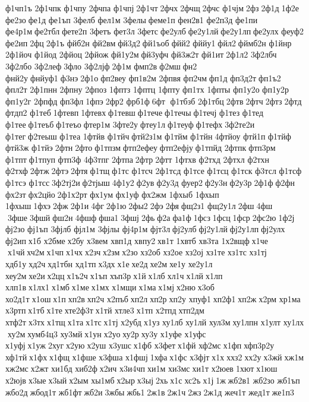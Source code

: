 ф1чп1ъ 
2ф1чпк 	ф1чпу 	2фчпа 	ф1чпј 2ф1чт 2фчх 2фчщ 2фчс 	ф1чјм 2фз 2ф1д 1ф2е 	фе2зо фе1д 	фе1ъп 	3фелб 	фел1м 	3фелы феме1п 
фен2в1 
фе2п3д 	фе1пи 
фе4р1м фе2тбл фете2п 	3фетъ 	фет3л 	3фетс фе2улб фе2у1лй фе2у1лп фе2улх 	феуф2 	фе2ип 2фц 2ф1ъ 	фйб2н 	фй2вм фй3д2 фй1ъоб фйй2 	фййу1 фйл2 фймб2н 	ф1йнр 
2ф1йоч 	ф1йод 	2фйоц 	2фйож 
фй1у2м фй3уфч 
фй3ж2т 	фй1ит 2ф1л2 
3ф2лбч 
3ф2лбо 
3ф2леф 3фло 
3ф2лјф 2ф1м 	фмп2в ф2мш фн2 	фнй2у фнйуф1 ф3нэ 2ф1о фп2веу 
фп1в2м 	2фпвя 	фп2чм фп1д 
фп3д2т фп1ъ2 	фпл2т 
2ф1пнн 	2фпну 	2фпоз 	1фптз 	1фптц 	1фпту 	фп1тх 	1фпты 
фп1у2о 
фп1у2р 
фп1у2г 	2фпфд 	фп3фл 1фпэ 2фр2 	фрб1ф 6фт  ф1тбзб 
2ф1тбц 2фтв 2фтч 2фтз 2фтд 	фтдп2 	ф1теб 1фтевп 1фтевх ф1тевш ф1тече ф1течы ф1течј 	ф1тез 	ф1тед 	ф1тее ф1теъб ф1теъо фтер1м 
3фте2у фтеу1л ф1теуф ф1тефх 3ф2те2и 	ф1тег ф2теыш 	ф1теа 	1фтйв 	ф1тйч фтй2з1м 	ф1тйм 	ф1тйн 4фтйоу 	фтй1п 	ф1тйф 	фтй3ж 	ф1тйэ 2фтн 2фто ф1тпзм фтп2ефеу фтп2ефју ф1тпйд 	2фтпк фтп3рм 	ф1тпт ф1тпуп 	фтп3ф 
4ф3тпг 	2фтпа 2фтр 2фтт 	1фтхв 	ф2тхд 	2фтхл 	ф2тхн 	ф2тхф 2фтж 2фтэ 2фтя ф1тщ ф1тс  	ф1тсч 
2ф1тсд 	ф1тсе 	ф1тсц 	ф1тск 	ф3тсл 	ф1тсф 	ф1тсэ 	ф1тсс 3ф2тј2и ф2тјыш 4ф1у2 ф2ув ф2у3д 	фуер2 ф2у3н ф2у3р 2ф1ф ф2фн 	фх2зт фх2цйо 2ф1х2рт 	фх1ум 	фх1уф 	фх2жм 	1фхыб 	1фхып 	1фхыш 1фхэ 2фж 2ф1и 4фг 2ф1ю 2фы2 2фэ 2фя фщ2з1 
фщ2у1л 2фш 4фш  3фше 3фшй фш2н 4фшф фша1 3фшј 2фь ф2а фа1ф 1фсз 1фсц 1фср 2фс2ю 1ф2ј 	фј2зо 	фј1ъп 	3фјлб 	фјл1м 	3фјлы 
фј4р1м 	фјт3л фј2улб фј2у1лй фј2у1лп фј2улх 	фј2ип х1б 	х2бме х2бу 	х3вем 	хвп1д 	хвпу2 хв1т 	1хвтб 	хв3та 
1х2вщф х1че  х1чй хч2м х1чп х1чх х2зч х2зм х2зо 	хз2об 	хз2ое 	хз2ој 	хз1те 	хз1тс 	хз1тј 	хдб1у хд2ч хд1тбн 	хд1тп х3дх х1е хе2д хе2м хе1у 
хе2у1л 	хеу2м хе2и х2цц х1ъ2ч х1ъп 	хъп3р х1й х1лб хл1ч х1лй х1лп 	хлп1в х1лх1 х1мб х1ме х1мх 	х1мщи х1ма х1мј х2ню х3об 
хо2д1т х1ош х1п хп2в хп2ч 	х2пъб хп2л хп2р хп2у 	хпуф1 хп2ф1 хп2ж х2рм 	хр1ма 	х3ртп х1тб х1те хте2ф3т х1тй 	хтле3 х1тп 	х2тпд хтп2дм 	хтф2т х3тх х1тщ х1та х1тс х1тј 	х2убд х1уз 	ху1лб 	ху1лй 	хул3м ху1лпн 	х1улт 
ху1лх  ху2м хумб4ц3 	ху3мй х1ун х2уо ху2р ху3у 	х1уфе 	х1уфс 	х1уфј х1уж 2хуг х2ую х2уш 	х3ушс х1фб 	х3фет х1фй 	хф2мс х1фп хфп3р2у 	хф1тй х1фх х1фщ 	х1фше 	х3фша 	х1фшј 1хфа х1фс 	х3фјт х1х ххз2 хх2у х3жй хж1м 	хж2мс х2жт 	хи1бд 	хиб2ф х2ич 
х3и4чп хи1м 	хи3мс хи1т 	х2юев 1хют х1юш 	х2юјв х3ые х3ый х2ым 	хы1мб х2ыр х3ыј 2хь х1с хс2ъ х1ј 1ж жб2в1 	жб2зо 	жб1ъп 	жбо2д жбод1т 	жб1фт жб2и 3жбы жбь1 2ж1в 2ж1ч 2жз 2ж1д 	жеч1т 	жед1т же1п3 
